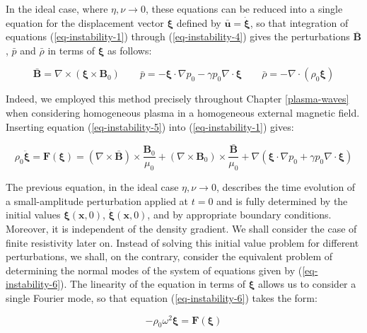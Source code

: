 In the ideal case, where $\eta,\nu\to0$, these equations can be reduced into a single equation for the displacement vector $\boldsymbol{\xi}$ defined by $\bar{\mathbf{u}}=\dot{\boldsymbol{\xi}}$, so that integration of equations (\ref{eq-instability-1}) through (\ref{eq-instability-4}) gives the perturbations $\bar{\mathbf{B}}$, $\bar{p}$ and $\bar{\rho}$ in terms of $\boldsymbol{\xi}$ as follows:

\begin{equation}
    \label{eq-instability-5}
    \bar{\mathbf{B}}=\nabla\times(\boldsymbol{\xi}\times\mathbf{B}_0)\qquad\bar{p}=-\boldsymbol{\xi}\cdot\nabla p_0-\gamma p_0\nabla\cdot\boldsymbol{\xi}\qquad\bar{\rho}=-\nabla\cdot(\rho_0\boldsymbol{\xi})
\end{equation}

Indeed, we employed this method precisely throughout Chapter \ref{plasma-waves} when considering homogeneous plasma in a homogeneous external magnetic field. Inserting equation (\ref{eq-instability-5}) into (\ref{eq-instability-1}) gives:

\begin{equation}
    \label{eq-instability-6}
    \rho_0\ddot{\boldsymbol{\xi}}=\mathbf{F}(\boldsymbol{\xi})=(\nabla\times\bar{\mathbf{B}})\times\frac{\mathbf{B}_0}{\mu_0}+(\nabla\times\mathbf{B}_0)\times\frac{\bar{\mathbf{B}}}{\mu_0}+\nabla(\boldsymbol{\xi}\cdot\nabla p_0+\gamma p_0\nabla\cdot\boldsymbol{\xi})
\end{equation}

The previous equation, in the ideal case $\eta,\nu\to0$, describes the time evolution of a small-amplitude perturbation applied at $t=0$ and is fully determined by the initial values $\boldsymbol{\xi}(\mathbf{x},0)$, $\dot{\boldsymbol{\xi}}(\mathbf{x},0)$, and by appropriate boundary conditions. Moreover, it is independent of the density gradient. We shall consider the case of finite resistivity later on. Instead of solving this initial value problem for different perturbations, we shall, on the contrary, consider the equivalent problem of determining the normal modes of the system of equations given by (\ref{eq-instability-6}). The linearity of the equation in terms of $\boldsymbol{\xi}$ allows us to consider a single Fourier mode, so that equation (\ref{eq-instability-6}) takes the form:

\begin{equation}
    \label{eq-inst-7}
    -\rho_0\omega^2\boldsymbol{\xi}=\mathbf{F}(\boldsymbol{\xi})
\end{equation}


